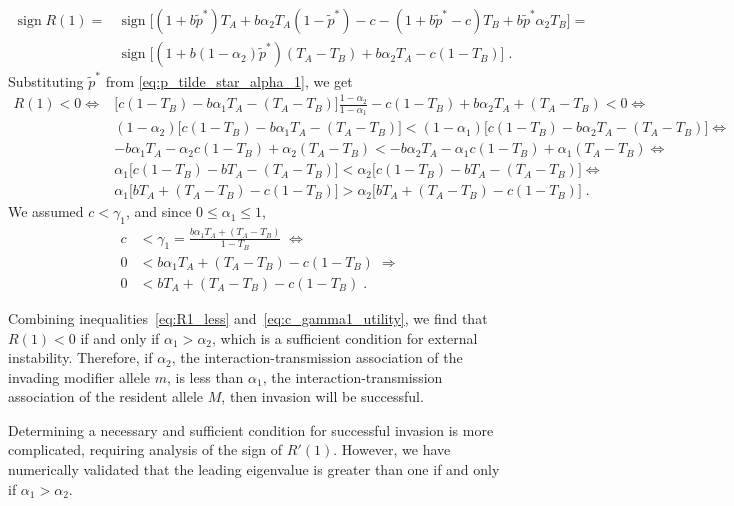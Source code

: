 \documentclass[12pt]{extarticle}
\DeclareMathOperator{\sign}{sign}
\begin{document}
\begin{appendices}
\begin{equation}
\begin{aligned}
\sign R(1) = 
&\sign\Big[
(1+b\tilde{p}^*)T_A + b\alpha_2 T_A (1-\tilde{p}^*) - c - 
(1+b\tilde{p}^*-c)T_B + b\tilde{p}^* \alpha_2 T_B \Big]
= \\
&\sign\Big[(1+b(1-\alpha_2)\tilde{p}^*)(T_A-T_B) + b\alpha_2 T_A - c (1-T_B) \Big]\;.
\end{aligned}
\end{equation}
Substituting $\tilde{p}^*$ from \autoref{eq:p_tilde_star_alpha_1}, we get
\begin{equation} \label{eq:R1_less}
\begin{aligned}
R(1)<0 \Leftrightarrow
&\big[c(1-T_B) - b \alpha_1 T_A - (T_A - T_B)\big] \frac{1-\alpha_2}{1-\alpha_1} - c (1-T_B) + b\alpha_2 T_A  + (T_A-T_B) < 0 \Leftrightarrow \\
&(1-\alpha_2)\big[c(1-T_B) - b \alpha_1 T_A - (T_A - T_B)\big] < (1-\alpha_1)\big[c (1-T_B) - b\alpha_2 T_A  - (T_A-T_B) \big] \Leftrightarrow \\
& - b \alpha_1 T_A -\alpha_2 c(1-T_B) +\alpha_2(T_A - T_B) < 
  - b\alpha_2 T_A -\alpha_1 c (1-T_B) +\alpha_1 (T_A-T_B)  \Leftrightarrow \\
& \alpha_1 \big[c (1-T_B) - b T_A-(T_A-T_B)\big]  < 
  \alpha_2 \big[c(1-T_B)-b T_A -(T_A - T_B)\big] \Leftrightarrow \\
& \alpha_1 \big[b T_A + (T_A-T_B) - c (1-T_B)\big]  > 
  \alpha_2 \big[b T_A + (T_A-T_B) - c (1-T_B)\big] \;.
\end{aligned}
\end{equation}
We assumed $c<\gamma_1$, and since $0 \le \alpha_1 \le 1$,
\begin{equation} \label{eq:c_gamma1_utility}
\begin{aligned}
c &< \gamma_1 = \frac{b \alpha_1 T_A + (T_A-T_B)}{1-T_B} \; \Leftrightarrow \\
0 &< b \alpha_1 T_A + (T_A-T_B) - c(1-T_B) \; \Rightarrow \\
0 &< b T_A + (T_A-T_B) - c(1-T_B) \;.
\end{aligned}
\end{equation}

Combining inequalities~\ref{eq:R1_less} and~\ref{eq:c_gamma1_utility}, we find that $R(1)<0$ if and only if $\alpha_1 > \alpha_2$, which is a sufficient condition for external instability. 
Therefore, if $\alpha_2$, the interaction-transmission association of the invading modifier allele $m$, is less than $\alpha_1$, the interaction-transmission association of the resident allele $M$, then invasion will be successful.

Determining a necessary and sufficient condition for successful invasion is more complicated, requiring analysis of the sign of $R'(1)$.
However, we have numerically validated that the leading eigenvalue is greater than one if and only if $\alpha_1>\alpha_2$.
  
\end{appendices}
\end{document}
